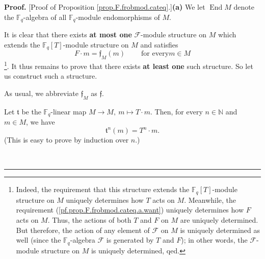 \documentclass[numbers=enddot,12pt,final,onecolumn,notitlepage]{scrartcl}%
\theoremstyle{definition}
\newenvironment{proof}[1][Proof]{\noindent\textbf{#1.} }{\ \rule{0.5em}{0.5em}}
\begin{document}
\begin{proof}
[Proof of Proposition \ref{prop.F.frobmod.cateq}.]\textbf{(a)} We let
$\operatorname*{End}M$ denote the $\mathbb{F}_{q}$-algebra of all
$\mathbb{F}_{q}$-module endomorphisms of $M$.

It is clear that there exists \textbf{at most one} $\mathcal{F}$-module
structure on $M$ which extends the $\mathbb{F}_{q}\left[  T\right]  $-module
structure on $M$ and satisfies%
\begin{equation}
F\cdot m=\mathfrak{f}_{M}\left(  m\right)  \ \ \ \ \ \ \ \ \ \ \text{for every
}m\in M \label{pf.prop.F.frobmod.cateq.a.want}%
\end{equation}
\footnote{Indeed, the requirement that this structure extends the
$\mathbb{F}_{q}\left[  T\right]  $-module structure on $M$ uniquely determines
how $T$ acts on $M$. Meanwhile, the requirement
(\ref{pf.prop.F.frobmod.cateq.a.want}) uniquely determines how $F$ acts on
$M$. Thus, the actions of both $T$ and $F$ on $M$ are uniquely determined. But
therefore, the action of any element of $\mathcal{F}$ on $M$ is uniquely
determined as well (since the $\mathbb{F}_{q}$-algebra $\mathcal{F}$ is
generated by $T$ and $F$); in other words, the $\mathcal{F}$-module structure
on $M$ is uniquely determined, qed.}. It thus remains to prove that there
exists \textbf{at least one} such structure. So let us construct such a structure.

As usual, we abbreviate $\mathfrak{f}_{M}$ as $\mathfrak{f}$.

Let $\mathfrak{t}$ be the $\mathbb{F}_{q}$-linear map $M\rightarrow
M,\ m\mapsto T\cdot m$. Then, for every $n\in\mathbb{N}$ and $m\in M$, we have%
\begin{equation}
\mathfrak{t}^{n}\left(  m\right)  =T^{n}\cdot m.
\label{pf.prop.F.frobmod.cateq.a.1}%
\end{equation}
(This is easy to prove by induction over $n$.)


\end{proof}
\end{document}
